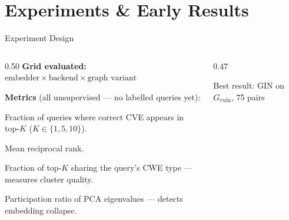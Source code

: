 \documentclass[aspectratio=169,10pt]{beamer}
\begin{document}
\section{Experiments \& Early Results}

\begin{frame}[fragile]{Experiment Design}
\begin{columns}[T]
\begin{column}{0.50\textwidth}
  \textbf{Grid evaluated:}
  $\text{embedder} \times \text{backend} \times \text{graph variant}$

  \vspace{0.5em}
  \textbf{Metrics} (all unsupervised — no labelled queries yet):
  \begin{description}
    \item[\textbf{Hit@K}] Fraction of queries where correct CVE appears in top-$K$ ($K \in \{1,5,10\}$).
    \item[\textbf{MRR}] Mean reciprocal rank.
    \item[\textbf{CWE recall}] Fraction of top-$K$ sharing the query's CWE type — measures cluster quality.
    \item[\textbf{Eff. dim}] Participation ratio of PCA eigenvalues — detects embedding collapse.
  \end{description}

\end{column}
\begin{column}{0.47\textwidth}
  \centering

  \medskip
  {\scriptsize\color{gray} Best result: GIN on $G_{\text{vuln}}$, 75 pairs}
\end{column}
\end{columns}
\end{frame}
\end{document}
